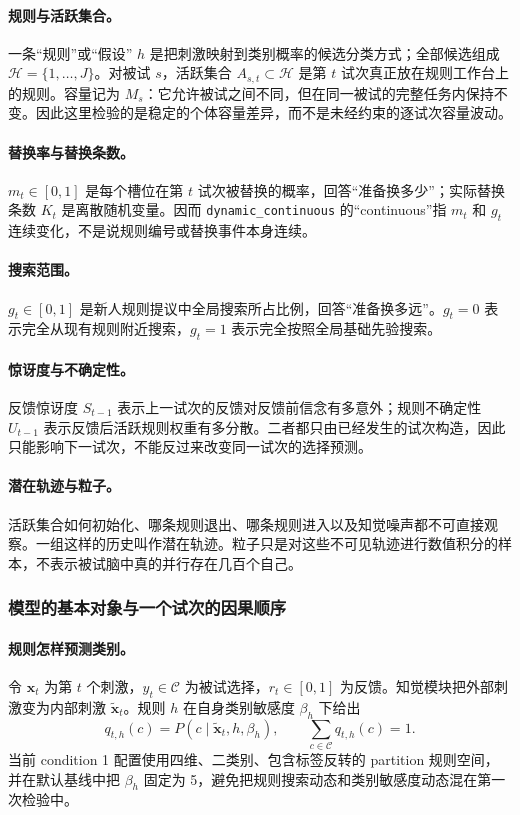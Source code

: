 \paragraph{规则与活跃集合。}
一条“规则”或“假设” $h$ 是把刺激映射到类别概率的候选分类方式；全部候选组成 $\mathcal H=\{1,\ldots,J\}$。对被试 $s$，活跃集合 $A_{s,t}\subset\mathcal H$ 是第 $t$ 试次真正放在规则工作台上的规则。容量记为 $M_s$：它允许被试之间不同，但在同一被试的完整任务内保持不变。因此这里检验的是稳定的个体容量差异，而不是未经约束的逐试次容量波动。

\paragraph{替换率与替换条数。}
$m_t\in[0,1]$ 是每个槽位在第 $t$ 试次被替换的概率，回答“准备换多少”；实际替换条数 $K_t$ 是离散随机变量。因而 \texttt{dynamic\_continuous} 的“continuous”指 $m_t$ 和 $g_t$ 连续变化，不是说规则编号或替换事件本身连续。

\paragraph{搜索范围。}
$g_t\in[0,1]$ 是新人规则提议中全局搜索所占比例，回答“准备换多远”。$g_t=0$ 表示完全从现有规则附近搜索，$g_t=1$ 表示完全按照全局基础先验搜索。

\paragraph{惊讶度与不确定性。}
反馈惊讶度 $S_{t-1}$ 表示上一试次的反馈对反馈前信念有多意外；规则不确定性 $U_{t-1}$ 表示反馈后活跃规则权重有多分散。二者都只由已经发生的试次构造，因此只能影响下一试次，不能反过来改变同一试次的选择预测。

\paragraph{潜在轨迹与粒子。}
活跃集合如何初始化、哪条规则退出、哪条规则进入以及知觉噪声都不可直接观察。一组这样的历史叫作潜在轨迹。粒子只是对这些不可见轨迹进行数值积分的样本，不表示被试脑中真的并行存在几百个自己。


\subsubsection{模型的基本对象与一个试次的因果顺序}

\paragraph{规则怎样预测类别。}
令 $\mathbf x_t$ 为第 $t$ 个刺激，$y_t\in\mathcal C$ 为被试选择，$r_t\in[0,1]$ 为反馈。知觉模块把外部刺激变为内部刺激 $\widetilde{\mathbf x}_t$。规则 $h$ 在自身类别敏感度 $\beta_h$ 下给出
\begin{equation}
q_{t,h}(c)
=P\!\left(c\mid\widetilde{\mathbf x}_t,h,\beta_h\right),
\qquad
\sum_{c\in\mathcal C}q_{t,h}(c)=1.
\label{eq:model0809-rule-category}
\end{equation}
当前 condition 1 配置使用四维、二类别、包含标签反转的 partition 规则空间，并在默认基线中把 $\beta_h$ 固定为 5，避免把规则搜索动态和类别敏感度动态混在第一次检验中。

